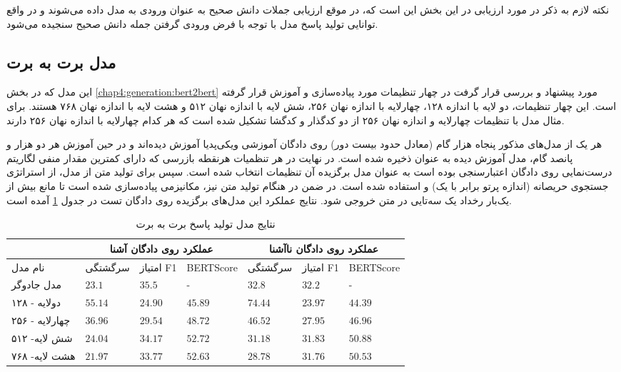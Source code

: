 نکته لازم به ذکر در مورد ارزیابی در این بخش این است که، در موقع ارزیابی جملات دانش صحیح به عنوان ورودی به مدل داده‌ می‌شوند و در واقع توانایی تولید پاسخ مدل با توجه با فرض ورودی گرفتن جمله دانش صحیح سنجیده می‌شود. 

\subsection{مدل برت به برت}
این مدل که در بخش 
\ref{chap4:generation:bert2bert}
مورد پیشنهاد و بررسی قرار گرفت در چهار تنظیمات مورد پیاده‌سازی و آموزش قرار گرفته است. این چهار تنظیمات، دو لایه با اندازه ۱۲۸، چهارلایه با اندازه نهان ۲۵۶، شش لایه با اندازه نهان ۵۱۲ و هشت لایه با اندازه نهان ۷۶۸ هستند. برای مثال مدل با تنظیمات چهارلایه و اندازه نهان ۲۵۶ از دو کدگذار و کدگشا تشکیل شده است که هر کدام چهارلایه با اندازه نهان ۲۵۶ دارند. 

هر یک از مدل‌های مذکور پنجاه هزار گام (معادل حدود بیست دور) روی دادگان آموزشی ویکی‌پدیا آموزش دیده‌اند و در حین آموزش هر دو هزار و پانصد گام، مدل آموزش دیده به عنوان 
ذخیره شده است. در نهایت  در هر تنظمیات  هرنقطه‌ بازرسی که دارای کمترین مقدار منفی لگاریتم درست‌نمایی روی دادگان اعتبارسنجی بوده است به عنوان مدل برگزیده آن تنظیمات انتخاب شده است. سپس برای تولید متن از مدل، از استراتژی
جستجوی حریصانه (اندازه پرتو برابر با یک)  و  
استفاده شده است.  در ضمن در هنگام تولید متن نیز، مکانیزمی پیاده‌سازی شده است تا مانع بیش از یک‌بار رخداد یک سه‌تایی در متن خروجی شود. 
نتایج عملکرد این مدل‌های برگزیده روی دادگان تست در جدول 
\ref{table:generation:bert2bert:beam1}
 آمده است.
\begin{table}[htb]
	\caption{ نتایج مدل تولید پاسخ برت به برت}
	\label{table:generation:bert2bert:beam1}
	\begin{tabular}{|l|l|l|l|l|l|l|}
		\hline
		& \multicolumn{3}{c|}{عملکرد روی دادگان آشنا}           & \multicolumn{3}{c|}{عملکرد روی دادگان نا‌آشنا}         \\ \hline
		نام مدل        & سرگشتگی          & امتیاز F1       & BERTScore        & سرگشتگی          & امتیاز F1        & BERTScore        \\ \hline
		مدل جادوگر     & $23.1$           & $\mathbf{35.5}$ & -                & $32.8$           & $32.2$           & -                \\ \hline
		دولایه - ۱۲۸   & $55.14$          & $24.90$         & $45.89$          & $74.44$          & $23.97$          & $44.39$          \\ \hline
		چهارلایه - ۲۵۶ & $36.96$          & $29.54$         & $48.72$          & $46.52$          & $27.95$          & $46.96$          \\ \hline
		شش لایه- ۵۱۲   & $24.04$          & $34.17$         & $\mathbf{52.72}$ & $31.18$          & $\mathbf{31.83}$ & $\mathbf{50.88}$ \\ \hline
		هشت لایه- ۷۶۸  & $\mathbf{21.97}$ & $33.77$         & $52.63$          & $\mathbf{28.78}$ & $31.76$          & $50.53$          \\ \hline
	\end{tabular}
\end{table}


